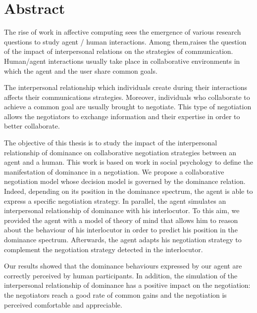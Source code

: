 \vfill
\clearpage
\chapter*{Abstract}

The rise of work in affective computing sees the emergence of various research questions to study agent / human interactions. Among them,raises the question of the impact of interpersonal relations on the strategies of communication.
Human/agent interactions usually take place in collaborative environments in which the agent and the user share common goals.

The interpersonal relationship which individuals create during their interactions affects their communications strategies. Moreover, individuals who collaborate to achieve a common goal are usually brought to negotiate. This type of negotiation allows the negotiators to  exchange information and their expertise in order to better collaborate.

The objective of this thesis is to study the impact of the interpersonal relationship of dominance on collaborative negotiation strategies between an agent and a human.
This work is based on work in social psychology to define the manifestation of dominance in a negotiation.
We propose a collaborative negotiation model whose decision model is governed by the dominance relation.
Indeed, depending on its position in the dominance spectrum, the agent is able to express a specific negotiation strategy.
In parallel, the agent simulates an interpersonal relationship of dominance with his interlocutor. To this aim, we provided the agent with a model of theory of mind that allows him to reason about the behaviour of his interlocutor in order to predict his position in the dominance spectrum. Afterwards, the agent adapts his negotiation strategy to complement the negotiation strategy detected in the interlocutor.

Our results showed that the dominance behaviours expressed by our agent are correctly perceived by human participants. In addition, the simulation of the interpersonal relationship of dominance has a positive impact on the negotiation: the negotiators reach a good rate of common gains and the negotiation is perceived comfortable and appreciable.

